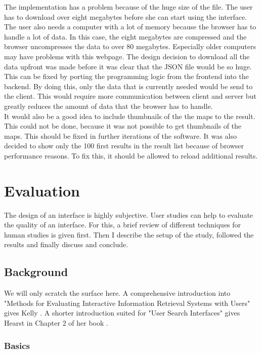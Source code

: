 \documentclass[11pt]{report}
\begin{document}
The implementation has a problem because of the huge size of the  file. The user has to download over eight megabytes before she can start using the interface. The user also needs a computer with a lot of memory because the browser has to handle a lot of data. In this case, the eight megabytes are compressed and the browser uncompresses the data to over 80 megabytes. Especially older computers may have problems with this webpage. The design decision to download all the data upfront was made before it was clear that the JSON file would be so huge. This can be fixed by porting the programming logic from the frontend into the backend. By doing this, only the data that is currently needed would be send to the client. This would require more communication between client and server but greatly reduces the amount of data that the browser has to handle. \\

 It would also be a good idea to include thumbnails of the the maps to the result. This could not be done, because it was not possible to get thumbnails of the maps. This should be fixed in further iterations of the software. It was also decided to show only the 100 first results in the result list because of browser performance reasons. To fix this, it should be allowed to reload additional results.

\chapter{Evaluation}
\label{Evaluation}

The design of an interface is highly subjective. User studies can help to evaluate the quality of an interface. For this, a brief review of different techniques for human studies is given first. Then I describe the setup of the study, followed the results and finally discuss and conclude.

\section{Background}

We will only scratch the surface here. A comprehensive introduction into "Methods for Evaluating Interactive Information Retrieval Systems with Users" gives Kelly \cite{Kelly2007}. A shorter introduction suited for "User Search Interfaces" gives Hearst in Chapter 2 of her book \cite{Hearst2009}.

\subsection{Basics}
\end{document}
